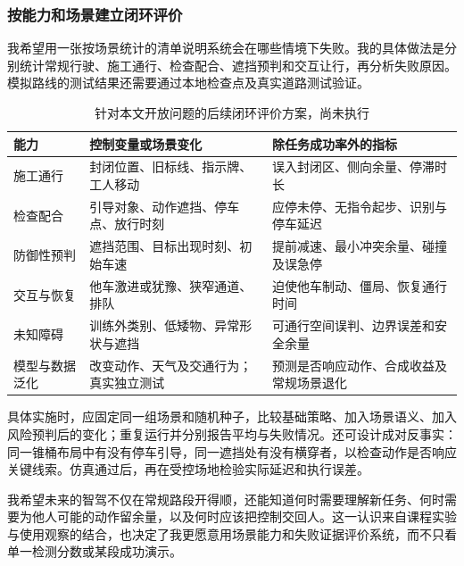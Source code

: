 \documentclass[UTF8,zihao=-4,fontset=windows]{ctexart}
\begin{document}
\subsubsection{按能力和场景建立闭环评价}
我希望用一张按场景统计的清单说明系统会在哪些情境下失败。我的具体做法是分别统计常规行驶、施工通行、检查配合、遮挡预判和交互让行，再分析失败原因。模拟路线的测试结果还需要通过本地检查点及真实道路测试验证。
\begin{table}[H]\centering\small\caption{针对本文开放问题的后续闭环评价方案，尚未执行}
\begin{tabularx}{\textwidth}{p{2.1cm}XX}\toprule
能力 & 控制变量或场景变化 & 除任务成功率外的指标\\\midrule
施工通行 & 封闭位置、旧标线、指示牌、工人移动 & 误入封闭区、侧向余量、停滞时长\\
检查配合 & 引导对象、动作遮挡、停车点、放行时刻 & 应停未停、无指令起步、识别与停车延迟\\
防御性预判 & 遮挡范围、目标出现时刻、初始车速 & 提前减速、最小冲突余量、碰撞及误急停\\
交互与恢复 & 他车激进或犹豫、狭窄通道、排队 & 迫使他车制动、僵局、恢复通行时间\\
未知障碍 & 训练外类别、低矮物、异常形状与遮挡 & 可通行空间误判、边界误差和安全余量\\
模型与数据泛化 & 改变动作、天气及交通行为；真实独立测试 & 预测是否响应动作、合成收益及常规场景退化\\\bottomrule\end{tabularx}\end{table}
具体实施时，应固定同一组场景和随机种子，比较基础策略、加入场景语义、加入风险预判后的变化；重复运行并分别报告平均与失败情况。还可设计成对反事实：同一锥桶布局中有没有停车引导，同一遮挡处有没有横穿者，以检查动作是否响应关键线索。仿真通过后，再在受控场地检验实际延迟和执行误差。

我希望未来的智驾不仅在常规路段开得顺，还能知道何时需要理解新任务、何时需要为他人可能的动作留余量，以及何时应该把控制交回人。这一认识来自课程实验与使用观察的结合，也决定了我更愿意用场景能力和失败证据评价系统，而不只看单一检测分数或某段成功演示。
\end{document}
